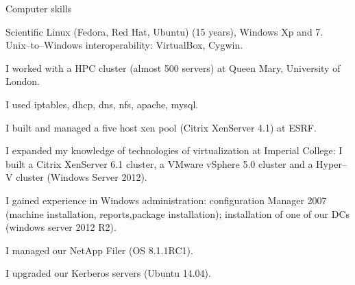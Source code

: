 \begin{rubric}{Computer skills}


\entry*[15 years]
Scientific Linux (Fedora, Red Hat, Ubuntu) (15 years), 
Windows Xp and 7.
Unix--to--Windows interoperability: VirtualBox, Cygwin.

\entry*
I worked with a HPC cluster (almost 500 servers) 
at Queen Mary, University of London.


I used iptables, dhcp, dns, nfs, apache, mysql. 

\entry*
I built and managed a five host xen pool (Citrix XenServer
4.1) at ESRF. 

\entry*
I expanded my knowledge of technologies of virtualization at
Imperial College: I built a Citrix XenServer 6.1 cluster, a
VMware vSphere 5.0 cluster and a Hyper–V cluster (Windows
Server 2012).

I gained experience in Windows administration: configuration
Manager 2007 (machine installation, reports,package installation);
installation of one of our DCs (windows server 2012 R2). 

I managed our NetApp Filer (OS 8.1.1RC1).

I upgraded our Kerberos servers (Ubuntu 14.04).





\end{rubric}
